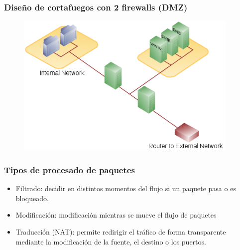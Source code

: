 \documentclass{beamer}
\begin{document}
\begin{frame}
\frametitle{Diseño de cortafuegos con 2 firewalls (DMZ)}

\begin{figure}[h]

\begin{center}
  \centering
  \includegraphics[height=2.7in]{figs/500px-DMZ_network_diagram_2_firewall.png}
\end{center}
\end{figure}

\end{frame}



\begin{frame}
\frametitle{Tipos de procesado de paquetes}

\begin{itemize}
\item \alert{Filtrado:} decidir en distintos momentos del flujo si un paquete pasa o es bloqueado.
\item \alert{Modificación:} modificación mientras se mueve el flujo de paquetes
\item \alert{Traducción (NAT)}: permite redirigir el tráfico de forma transparente mediante la modificación de la fuente, el destino o los puertos.
\end{itemize}

\end{frame}

\end{document}
